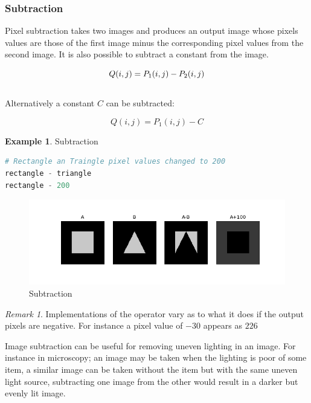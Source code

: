 \documentclass{article}
\theoremstyle{definition}
\newtheorem{ex}{Example}[subsection]
\theoremstyle{remark}
\newtheorem*{rem}{Remark}
\begin{document}
\subsubsection{Subtraction}

Pixel subtraction  takes two images and produces an output image whose pixels values are those of the first image minus the corresponding pixel values from the second image. It is also possible to subtract a constant from the image.

\begin{equation}
    Q(i, j) = P_1(i, j) - P_2(i, j)\\
\end{equation}\\

\noindent Alternatively a constant $ C $ can be subtracted:

\begin{equation*}
    Q(i, j) = P_1(i, j) - C
\end{equation*}

\begin{ex} Subtraction
\begin{lstlisting}[language=Python]
# Rectangle an Traingle pixel values changed to 200
rectangle - triangle
rectangle - 200
\end{lstlisting}
\begin{figure}[h!]
    \centering
    \includegraphics[width=\textwidth]{ocv_subtraction}
    \caption{Subtraction}
    \label{fig:ocv_sub}
\end{figure}
\end{ex}

\begin{rem}
Implementations of the operator vary as to what it does if the output pixels are negative. For instance a pixel value of $ -30 $ appears as $ 226 $ 
\end{rem}

Image subtraction can be useful for removing uneven lighting in an image. For instance in microscopy; an image may be taken when the lighting is poor of some item, a similar image can be taken without the item but with the same uneven light source, subtracting one image from the other would result in a darker but evenly lit image.
\end{document}

